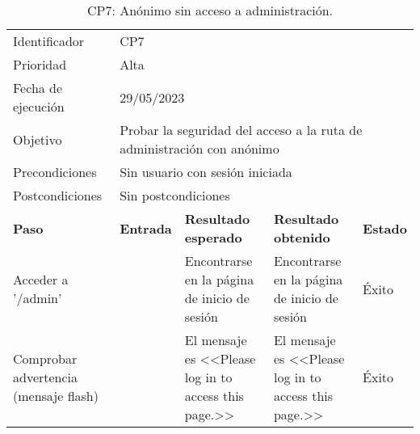     \begin{center}
    \begin{table}[H]
    \begin{tabular}{p{}p{}p{}p{}p{}}
    \rowcolor{gray!25}
    Identificador   & \multicolumn{4}{l}{CP7}                                                   \\
    Prioridad   & \multicolumn{4}{l}{Alta}                                                    \\
    \rowcolor{gray!25}
    Fecha de ejecución   & \multicolumn{4}{l}{29/05/2023}                                                    \\
    Objetivo        & \multicolumn{4}{p{0.80\textwidth}}{Probar la seguridad del acceso a la ruta de administración con anónimo}                                                     \\
    \rowcolor{gray!25}
    Precondiciones  & \multicolumn{4}{l}{Sin usuario con sesión iniciada}                                                     \\
    Postcondiciones & \multicolumn{4}{l}{Sin postcondiciones}                                                     \\ \hline
    \rowcolor{gray!25}
    \textbf{Paso}   & \textbf{Entrada} & \textbf{Resultado esperado} & \textbf{Resultado obtenido} & \textbf{Estado} \\ \hline
    Acceder a '/admin'                         &                        & Encontrarse en la página de inicio de sesión                                 & Encontrarse en la página de inicio de sesión                                     & Éxito  \\ \hline
    Comprobar advertencia (mensaje flash)      &                        & El mensaje es <<Please log in to access this page.>>                               & El mensaje es <<Please log in to access this page.>>                                 & Éxito  \\ \hline 
    \end{tabular}
    \caption{CP7: Anónimo sin acceso a administración.}
    \end{table}
    \end{center}
    
